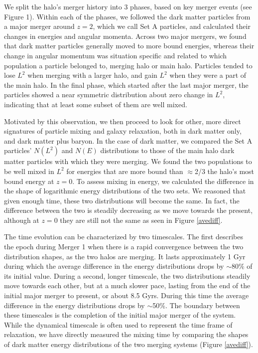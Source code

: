 \documentclass[a4paper,11pt]{article}
\begin{document}
We split the halo's merger history into 3 phases, based on key merger events (see Figure 1).  Within each of the phases, we followed the dark matter 
particles from a major merger around $z=2$, which we call Set A particles, and calculated their changes in energies and angular momenta. Across two major 
mergers, we found that dark matter particles generally moved to more bound energies, whereas their change in angular momentum was situation specific 
and related to which population a particle belonged to, merging halo or main halo.  Particles tended to lose $L^2$ when merging with a larger halo, and gain 
$L^2$ when they were a part of the main halo.  In the final phase, which started after the last major merger, the particles showed a near symmetric 
distribution about zero change in $L^2$, indicating that at least some subset of them are well mixed.

Motivated by this observation, we then proceed to look for other, more direct signatures of particle mixing and galaxy relaxation, both in dark matter only, 
and dark matter plus baryon.  In the case of dark matter, we compared the Set A particles' $N(L^2)$ and $N(E)$ distributions to those of the main halo dark 
matter particles with which they were merging.  We found the two populations to be well mixed in $L^2$ for energies that are more bound than $\approx$2/3 the 
halo's most bound energy at $z=0$.  To assess mixing in energy, we calculated the difference in the shape of logarithmic energy distributions of the two 
sets.  We reasoned that given enough time, these two distributions will become the same.  In fact, the difference between the two is steadily decreasing as 
we move towards the present, although at $z=0$ they are still not the same as seen in Figure \ref{avediff}.  

The time evolution can be characterized by two 
timescales. The first describes the epoch during Merger 1 when there is a rapid convergence between the two distribution shapes, as the two halos are 
merging.  It lasts approximately 1 Gyr during which the average difference in the energy distributions drops by $\sim$80\% of its initial value.  During a 
second, longer timescale, the two distributions steadily move towards each other, but at a much slower pace, lasting from the end of the initial major 
merger to present, or about 8.5 Gyrs. During this time the average difference in the energy distributions drops by $\sim$50\%.  The 
boundary between these timescales is the completion of the initial major merger of the system. While the dynamical timescale is often used to represent the 
time frame of relaxation, we have directly measured the mixing time by comparing the shapes of dark matter energy distributions of the two merging systems 
(Figure \ref{avediff}).  
\end{document}
